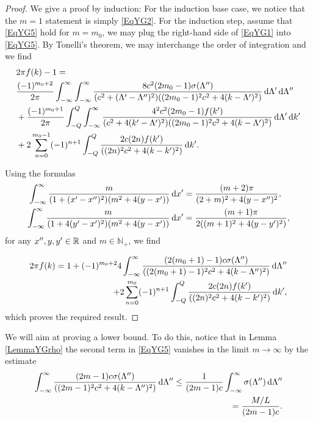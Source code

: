 \begin{proof}
	We give a proof by induction: For the induction base case, we notice that the $ m=1 $ statement is simply \eqref{EqYG2}. For the induction step, assume that \eqref{EqYG5} hold for $ m=m_0 $, we may plug the right-hand side of \eqref{EqYG1} into \eqref{EqYG5}. By Tonelli's theorem, we may interchange the order of integration and we find\begin{equation}
	\begin{aligned}
	&2\pi  f(k)-1=\\
	&\frac{(-1)^{m_0+2}}{2\pi}\int_{-\infty}^{\infty}\int_{-\infty}^{\infty}\frac{8c^2(2m_0-1)\sigma(\Lambda'')}{(c^2+(\Lambda'-\Lambda'')^2)((2m_0-1)^2c^2+4(k-\Lambda')^2)}\mathop{}\!\mathrm{d}\Lambda'\mathop{}\!\mathrm{d}\Lambda''\\
	&+\frac{(-1)^{m_0+1}}{2\pi}\int_{-Q}^{Q}\int_{-\infty}^{\infty}\frac{4^2c^2(2m_0-1) f(k')}{(c^2+4(k'-\Lambda')^2)((2m_0-1)^2c^2+4(k-\Lambda')^2)}\mathop{}\!\mathrm{d}\Lambda'\mathop{}\!\mathrm{d} k'\\
	&+2\sum_{n=0}^{m_0-1}(-1)^{n+1}\int_{-Q}^{Q}\frac{2c(2n) f(k')}{((2n)^2c^2+4(k-k')^2)}\mathop{}\!\mathrm{d} k'.
	\end{aligned}
	\end{equation}
	
	Using the formulas
	\begin{align}
	\int_{-\infty}^{\infty}\frac{m}{(1+(x'-x'')^2)(m^2+4(y-x'))}\mathop{}\!\mathrm{d} x'&=\frac{(m+2)\pi}{(2+m)^2+4(y-x'')^2},\\
	\int_{-\infty}^{\infty}\frac{m}{(1+4(y'-x')^2)(m^2+4(y-x'))}\mathop{}\!\mathrm{d} x'&=\frac{(m+1)\pi}{2((m+1)^2+4(y-y')^2)},
	\end{align}
	for any $ x'',y,y'\in\mathbb{R} $ and $ m\in\mathbb{N}_+ $, we find 
	
	\begin{equation}
	\begin{aligned}
	2\pi  f(k)=1+(-1)^{m_0+2}4\int_{-\infty}^{\infty}\frac{ (2(m_0+1)-1)c\sigma(\Lambda'')}{((2(m_0+1)-1)^2 c^2+4(k-\Lambda'')^2)}\mathop{}\!\mathrm{d}\Lambda''\\
	+2\sum_{n=0}^{m_0}(-1)^{n+1}\int_{-Q}^{Q}\frac{2c(2n) f(k')}{((2n)^2c^2+4(k-k')^2)}\mathop{}\!\mathrm{d} k',
	\end{aligned}
	\end{equation}
	which proves the required result.
\end{proof}
We will aim at proving a lower bound. To do this, notice that in Lemma \ref{LemmaYGrho} the second term in \eqref{EqYG5} vanishes in the limit $ m\to\infty $ by the estimate \begin{equation}\label{EqYGLemma1bound}
	\begin{aligned}
	\int_{-\infty}^{\infty}\frac{ (2m-1)c\sigma(\Lambda'')}{((2m-1)^2 c^2+4(k-\Lambda'')^2)}\mathop{}\!\mathrm{d}\Lambda''\leq \frac{1}{(2m-1)c}\int_{-\infty}^{\infty}\sigma(\Lambda'')\mathop{}\!\mathrm{d} \Lambda''\\=\frac{M/L}{(2m-1)c}.
	\end{aligned}
	\end{equation}
